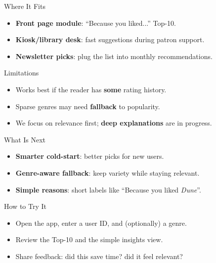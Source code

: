 \documentclass[aspectratio=169,11pt]{beamer}
\begin{document}
\begin{frame}{Where It Fits}
\begin{itemize}
  \item \textbf{Front page module}: ``Because you liked...'' Top-10.
  \item \textbf{Kiosk/library desk}: fast suggestions during patron support.
  \item \textbf{Newsletter picks}: plug the list into monthly recommendations.
\end{itemize}
\end{frame}

\begin{frame}{Limitations}
\begin{itemize}
  \item Works best if the reader has \textbf{some} rating history.
  \item Sparse genres may need \textbf{fallback} to popularity.
  \item We focus on relevance first; \textbf{deep explanations} are in progress.
\end{itemize}
\end{frame}

\begin{frame}{What Is Next}
\begin{itemize}
  \item \textbf{Smarter cold-start}: better picks for new users.
  \item \textbf{Genre-aware fallback}: keep variety while staying relevant.
  \item \textbf{Simple reasons}: short labels like ``Because you liked \emph{Dune}''.
\end{itemize}
\end{frame}

\begin{frame}{How to Try It}
\begin{itemize}
  \item Open the app, enter a user ID, and (optionally) a genre.
  \item Review the Top-10 and the simple insights view.
  \item Share feedback: did this save time? did it feel relevant?
\end{itemize}
\end{frame}
\end{document}
